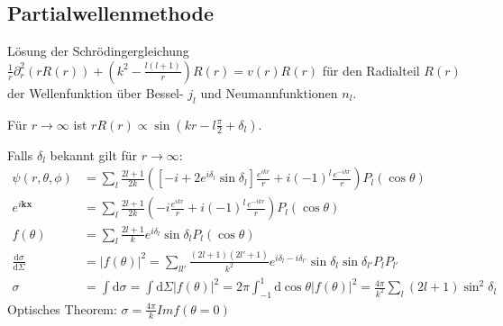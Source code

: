 \documentclass[10pt,a4paper,notitlepage]{scrartcl}
\begin{document}
\subsection*{Partialwellenmethode}

Lösung der Schrödingergleichung $\frac{1}{r} \partial_r^2 (r R(r)) + (k^2 - \frac{l(l+1)}{r})R(r) = v(r) R(r)$ für den Radialteil $R(r)$ der Wellenfunktion über Bessel- $j_l$ und Neumannfunktionen $n_l$.

Für $r\rightarrow \infty$ ist $r R(r) \propto \sin \left(kr - l\frac{\pi}{2} + \delta_l\right)$.

Falls $\delta_l$ bekannt gilt für $r \rightarrow \infty$:
\begin{align*}
    \psi(r, \theta, \phi) &= \sum_l \frac{2 l + 1}{2 k} \left( \left[ -i + 2 e^{i \delta_l} \sin \delta_l \right] \frac{e^{i k r}}{r} + i (-1)^l \frac{e^{-i k r}}{r}\right) P_l(\cos \theta) \\
    e^{i \mathbf{k} \mathbf{x}} &= \sum_l \frac{2 l + 1}{2 k} \left( -i \frac{e^{i k r}}{r} + i (-1)^l \frac{e^{-i k r}}{r}\right) P_l(\cos \theta) \\
    f(\theta) &= \sum_l \frac{2 l + 1}{ k}  e^{i \delta_l} \sin \delta_l  P_l(\cos \theta) \\
    \frac{\mathrm{d} \sigma}{\mathrm{d} \Sigma} &= |f(\theta)|^2 = \sum_{l l'} \frac{(2 l + 1)(2 l' + 1)}{k^2} e^{i \delta_l - i \delta_{l'}} \sin \delta_l \sin \delta_{l'} P_l P_{l'} \\
    \sigma &= \int \mathrm{d}\sigma = \int \mathrm{d} \Sigma |f(\theta)|^2 = 2\pi \int_{-1}^1 \mathrm{d}\cos \theta |f(\theta)|^2 =\frac{4\pi}{k^2} \sum_l (2 l + 1) \sin^2 \delta_l 
\end{align*}
Optisches Theorem: $\sigma = \frac{4\pi}{k} Im f(\theta = 0)$
\end{document}
